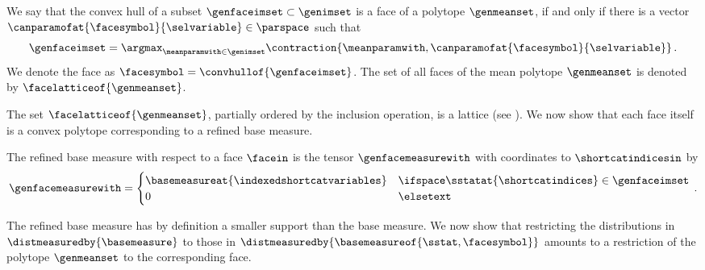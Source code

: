 \begin{definition}
    We say that the convex hull of a subset $\genfaceimset\subset\genimset$ is a face of a polytope $\genmeanset$, if and only if there is a vector $\canparamofat{\facesymbol}{\selvariable}\in\parspace$ such that
    \begin{align*}
        \genfaceimset
        = \argmax_{\meanparamwith\in\genimset} \contraction{\meanparamwith,\canparamofat{\facesymbol}{\selvariable}} \, .
    \end{align*}
    We denote the face as $\facesymbol=\convhullof{\genfaceimset}$.
    The set of all faces of the mean polytope $\genmeanset$ is denoted by $\facelatticeof{\genmeanset}$.
\end{definition}

The set $\facelatticeof{\genmeanset}$, partially ordered by the inclusion operation, is a lattice (see \cite{ziegler_lectures_2013}).
We now show that each face itself is a convex polytope corresponding to a refined base measure.

\begin{definition}
    \label{def:faceMeasure}
    The refined base measure with respect to a face $\facein$ is the tensor $\genfacemeasurewith$ with coordinates to $\shortcatindicesin$ by
    \begin{align*}
        \genfacemeasurewith
        = \begin{cases}
              \basemeasureat{\indexedshortcatvariables} & \ifspace \sstatat{\shortcatindices}\in\genfaceimset \\
              0 & \elsetext
        \end{cases} \, .
    \end{align*}
\end{definition}

The refined base measure has by definition a smaller support than the base measure.
We now show that restricting the distributions in $\distmeasuredby{\basemeasure}$ to those in $\distmeasuredby{\basemeasureof{\sstat,\facesymbol}}$ amounts to a restriction of the polytope $\genmeanset$ to the corresponding face.


